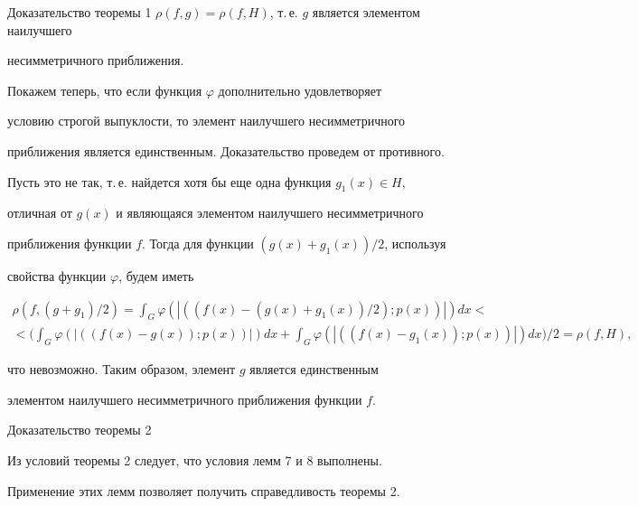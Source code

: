 \begin{pf*}{Доказательство теоремы 1}
$\rho(f,g)=\rho(f,H)$, т.\,е. $g$ является элементом наилучшего 


несимметричного приближения. 


 


Покажем теперь, что если функция $\varphi$ дополнительно удовлетворяет 


условию строгой выпуклости, то элемент наилучшего несимметричного 


приближения является единственным. Доказательство проведем от противного. 


Пусть это не так, т.\,е. найдется хотя бы еще одна функция $g_1(x)\in H$, 


отличная от $g(x)$ и являющаяся элементом наилучшего несимметричного 


приближения функции $f$. Тогда для функции $(g(x)+g_1(x))/2$, используя 


свойства функции $\varphi$, будем иметь 


\begin{multline*} 


\rho(f,(g+g_1)/2)=\int_G \varphi(|((f(x)-(g(x)+g_1(x))/2); 


p(x))|)dx < \\ 


% 


<\bigg(\int_G \varphi(|((f(x)-g(x));p(x))|)dx+ 


\int_G \varphi(|((f(x)-g_1(x));p(x))|)dx\bigg)/2=\rho(f,H), 


\end{multline*} 


что невозможно. Таким образом, элемент $g$ является единственным 


элементом наилучшего несимметричного приближения функции $f$. 


\end{pf*} 


 


 


\begin{pf*}{Доказательство теоремы 2} 


Из условий теоремы 2 следует, что условия лемм 7 и 8 выполнены. 


Применение этих лемм позволяет получить справедливость теоремы 2. 


\end{pf*} 


 


